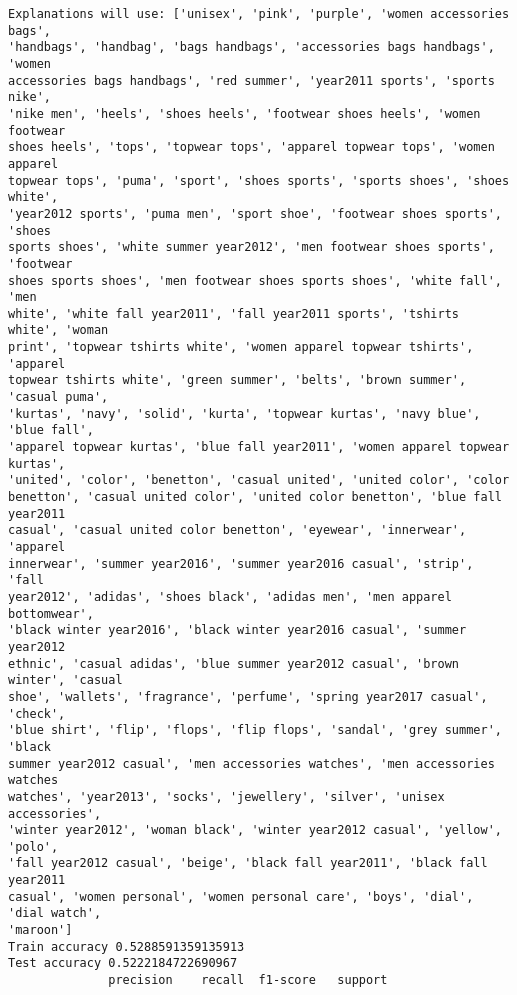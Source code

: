 \documentclass[11pt]{article}
\begin{document}
    \begin{Verbatim}[commandchars=\\\{\}]
Explanations will use: ['unisex', 'pink', 'purple', 'women accessories bags',
'handbags', 'handbag', 'bags handbags', 'accessories bags handbags', 'women
accessories bags handbags', 'red summer', 'year2011 sports', 'sports nike',
'nike men', 'heels', 'shoes heels', 'footwear shoes heels', 'women footwear
shoes heels', 'tops', 'topwear tops', 'apparel topwear tops', 'women apparel
topwear tops', 'puma', 'sport', 'shoes sports', 'sports shoes', 'shoes white',
'year2012 sports', 'puma men', 'sport shoe', 'footwear shoes sports', 'shoes
sports shoes', 'white summer year2012', 'men footwear shoes sports', 'footwear
shoes sports shoes', 'men footwear shoes sports shoes', 'white fall', 'men
white', 'white fall year2011', 'fall year2011 sports', 'tshirts white', 'woman
print', 'topwear tshirts white', 'women apparel topwear tshirts', 'apparel
topwear tshirts white', 'green summer', 'belts', 'brown summer', 'casual puma',
'kurtas', 'navy', 'solid', 'kurta', 'topwear kurtas', 'navy blue', 'blue fall',
'apparel topwear kurtas', 'blue fall year2011', 'women apparel topwear kurtas',
'united', 'color', 'benetton', 'casual united', 'united color', 'color
benetton', 'casual united color', 'united color benetton', 'blue fall year2011
casual', 'casual united color benetton', 'eyewear', 'innerwear', 'apparel
innerwear', 'summer year2016', 'summer year2016 casual', 'strip', 'fall
year2012', 'adidas', 'shoes black', 'adidas men', 'men apparel bottomwear',
'black winter year2016', 'black winter year2016 casual', 'summer year2012
ethnic', 'casual adidas', 'blue summer year2012 casual', 'brown winter', 'casual
shoe', 'wallets', 'fragrance', 'perfume', 'spring year2017 casual', 'check',
'blue shirt', 'flip', 'flops', 'flip flops', 'sandal', 'grey summer', 'black
summer year2012 casual', 'men accessories watches', 'men accessories watches
watches', 'year2013', 'socks', 'jewellery', 'silver', 'unisex accessories',
'winter year2012', 'woman black', 'winter year2012 casual', 'yellow', 'polo',
'fall year2012 casual', 'beige', 'black fall year2011', 'black fall year2011
casual', 'women personal', 'women personal care', 'boys', 'dial', 'dial watch',
'maroon']
Train accuracy 0.5288591359135913
Test accuracy 0.5222184722690967
              precision    recall  f1-score   support


\end{Verbatim}
\end{document}
